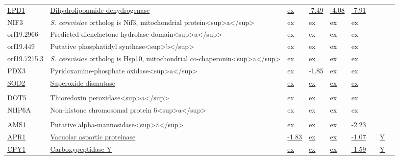 \begin{ThreePartTable}
\begin{longtable}[t]{lllllllll}
\hspace{1em}\underline{LPD1} & \underline{Dihydrolipoamide dehydrogenase} & \underline{ex} & \underline{-7.49} & \underline{-4.08} & \underline{-7.91} & \underline{} & \underline{} & \underline{}\\
\hspace{1em}NIF3 & \textit{S. cerevisiae} ortholog is Nif3, mitochondrial protein<sup>a</sup> & ex & ex & ex & ex &  &  & \\
\hspace{1em}orf19.2966 & Predicted dienelactone hydrolase domain<sup>a</sup> & ex & ex & ex & ex &  &  & \\
\hspace{1em}orf19.449 & Putative phosphatidyl synthase<sup>b</sup> & ex & ex & ex & ex &  &  & \\
\hspace{1em}orf19.7215.3 & \textit{S. cerevisiae} ortholog is Hsp10, mitochondrial co-chaperonin<sup>a</sup> & ex & ex & ex & ex &  &  & \\
\hspace{1em}PDX3 & Pyridoxamine-phosphate oxidase<sup>a</sup> & ex & -1.85 & ex & ex &  &  & \\
\hspace{1em}\underline{SOD2} & \underline{Superoxide dismutase} & \underline{ex} & \underline{ex} & \underline{ex} & \underline{ex} & \underline{} & \underline{} & \underline{}\\
\addlinespace[0.3em]
\multicolumn{9}{l}{\textbf{Nucleus}}\\
\hspace{1em}DOT5 & Thioredoxin peroxidase<sup>a</sup> & ex & ex & ex & ex &  &  & \\
\hspace{1em}NHP6A & Non-histone chromosomal protein 6<sup>a</sup> & ex & ex & ex & ex &  &  & \\
\addlinespace[0.3em]
\multicolumn{9}{l}{\textbf{Vacuole}}\\
\hspace{1em}AMS1 & Putative alpha-mannosidase<sup>a</sup> & ex & ex & ex & -2.23 &  &  & \\
\hspace{1em}\underline{APR1} & \underline{Vacuolar aspartic proteinase} & \underline{-1.83} & \underline{ex} & \underline{ex} & \underline{-1.07} & \underline{} & \underline{Y} & \underline{}\\
\hspace{1em}\underline{CPY1} & \underline{Carboxypeptidase Y} & \underline{ex} & \underline{ex} & \underline{ex} & \underline{-1.59} & \underline{} & \underline{Y} & \underline{}\\

\end{longtable}
\end{ThreePartTable}
